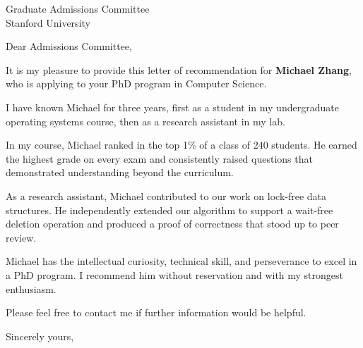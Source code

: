 \documentclass{letter}
\begin{document}
\begin{letter}{Graduate Admissions Committee \\ Stanford University}

\opening{Dear Admissions Committee,}

It is my pleasure to provide this letter of recommendation for \textbf{Michael Zhang}, who is applying to your PhD program in Computer Science.

I have known Michael for three years, first as a student in my undergraduate operating systems course, then as a research assistant in my lab.

In my course, Michael ranked in the top 1\% of a class of 240 students. He earned the highest grade on every exam and consistently raised questions that demonstrated understanding beyond the curriculum.

As a research assistant, Michael contributed to our work on lock-free data structures. He independently extended our algorithm to support a wait-free deletion operation and produced a proof of correctness that stood up to peer review.

Michael has the intellectual curiosity, technical skill, and perseverance to excel in a PhD program. I recommend him without reservation and with my strongest enthusiasm.

Please feel free to contact me if further information would be helpful.

\closing{Sincerely yours,}

\end{letter}
\end{document}
